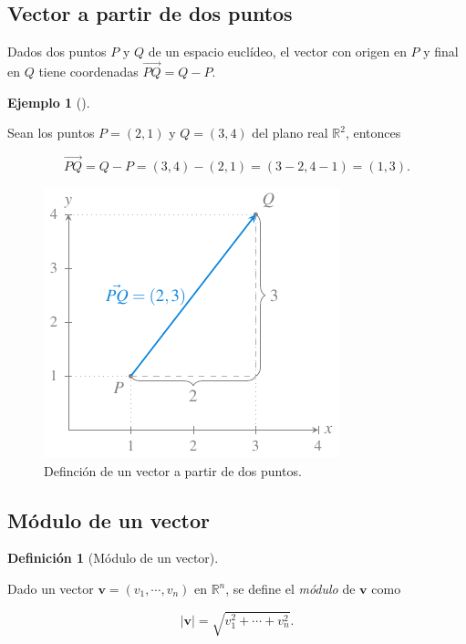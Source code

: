 \documentclass[
  a4paper,
]{scrreport}
\theoremstyle{definition}
\newtheorem{example}{Ejemplo}[chapter]
\theoremstyle{plain}
\theoremstyle{plain}
\theoremstyle{plain}
\theoremstyle{definition}
\newtheorem{definition}{Definición}[chapter]
\theoremstyle{remark}
\begin{document}
\hypertarget{vector-a-partir-de-dos-puntos}{%
\subsection{Vector a partir de dos
puntos}\label{vector-a-partir-de-dos-puntos}}

Dados dos puntos \(P\) y \(Q\) de un espacio euclídeo, el vector con
origen en \(P\) y final en \(Q\) tiene coordenadas \(\vec{PQ}=Q-P\).

\begin{example}[]\protect\hypertarget{exm-vector-dos-puntos}{}\label{exm-vector-dos-puntos}

Sean los puntos \(P=(2,1)\) y \(Q=(3,4)\) del plano real
\(\mathbb{R}^2\), entonces

\[\vec{PQ} = Q-P = (3,4)-(2,1) = (3-2,4-1) = (1,3).\]

\begin{figure}

{\centering \includegraphics{img/geometria-plano-espacio/vector-puntos.pdf}

}

\caption{Definción de un vector a partir de dos puntos.}

\end{figure}

\end{example}

\hypertarget{muxf3dulo-de-un-vector}{%
\subsection{Módulo de un vector}\label{muxf3dulo-de-un-vector}}

\begin{definition}[Módulo de un
vector]\protect\hypertarget{def-modulo-vector}{}\label{def-modulo-vector}

Dado un vector \(\mathbf{v}=(v_1,\cdots,v_n)\) en \(\mathbb{R}^n\), se
define el \emph{módulo} de \(\mathbf{v}\) como

\[
\lvert \mathbf{v} \rvert = \sqrt{v_1^2+ \cdots + v_n^2}.
\]

\end{definition}
\end{document}

